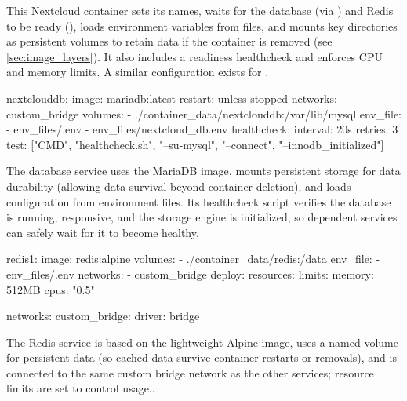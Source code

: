 \begin{exampleblock}
\vspace{-0.7em}

    This Nextcloud container sets its names, waits for the database (via ) and Redis to be ready (), loads environment variables from files, and mounts key directories as persistent volumes to retain data if the container is removed (see \cref{sec:image_layers}). It also includes a readiness healthcheck and enforces CPU and memory limits. A similar configuration exists for .

\vspace{-0.7em}

\begin{codeblock}[language=bash,basicstyle=\ttfamily\tiny,firstnumber=51, numberstyle=\tiny]
  nextclouddb:
    image: mariadb:latest
    restart: unless-stopped
    networks:
      - custom_bridge
    volumes:
      - ./container_data/nextclouddb:/var/lib/mysql
    env_file:
      - env_files/.env
      - env_files/nextcloud_db.env
    healthcheck:
      interval: 20s
      retries: 3
      test: ["CMD", "healthcheck.sh", "--su-mysql", "--connect", "--innodb_initialized"]
\end{codeblock}

\vspace{-0.7em}

The database service uses the MariaDB image, mounts persistent storage for data durability (allowing data survival beyond container deletion), and loads configuration from environment files. Its healthcheck script verifies the database is running, responsive, and the storage engine is initialized, so dependent services can safely wait for it to become healthy.

\vspace{-0.5em}

\begin{codeblock}[language=bash,basicstyle=\ttfamily\tiny,firstnumber=65, numberstyle=\tiny]
  redis1:
    image: redis:alpine
    volumes:
      - ./container_data/redis:/data
    env_file:
      - env_files/.env
    networks:
      - custom_bridge
    deploy:
      resources:
        limits:
          memory: 512MB
          cpus: "0.5"

networks:
  custom_bridge:
    driver: bridge
\end{codeblock}

\vspace{-0.5em}

The Redis service is based on the lightweight Alpine image, uses a named volume for persistent data (so cached data survive container restarts or removals), and is connected to the same custom bridge network as the other services; resource limits are set to control usage..

\end{exampleblock}

